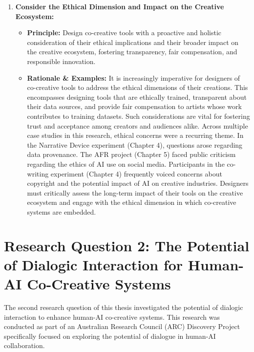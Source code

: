 \begin{enumerate}[label=\arabic*., wide, labelindent=0pt]
\item \textbf{Consider the Ethical Dimension and Impact on the Creative Ecosystem:}
    \begin{itemize}[label=\textbullet, leftmargin=*]
        \item \textbf{Principle:} Design co-creative tools with a proactive and holistic consideration of their ethical implications and their broader impact on the creative ecosystem, fostering transparency, fair compensation, and responsible innovation.
        \item \textbf{Rationale \& Examples:} It is increasingly imperative for designers of co-creative tools to address the ethical dimensions of their creations. This encompasses designing tools that are ethically trained, transparent about their data sources, and provide fair compensation to artists whose work contributes to training datasets. Such considerations are vital for fostering trust and acceptance among creators and audiences alike. Across multiple case studies in this research, ethical concerns were a recurring theme. In the Narrative Device experiment (Chapter 4), questions arose regarding data provenance. The AFR project (Chapter 5) faced public criticism regarding the ethics of AI use on social media. Participants in the co-writing experiment (Chapter 4) frequently voiced concerns about copyright and the potential impact of AI on creative industries. Designers must critically assess the long-term impact of their tools on the creative ecosystem and engage with the ethical dimension in which co-creative systems are embedded.
    \end{itemize}

\end{enumerate}

\section{Research Question 2: The Potential of Dialogic Interaction for Human-AI Co-Creative Systems}

The second research question of this thesis investigated the potential of dialogic interaction to enhance human-AI co-creative systems. This research was conducted as part of an Australian Research Council (ARC) Discovery Project specifically focused on exploring the potential of dialogue in human-AI collaboration.

